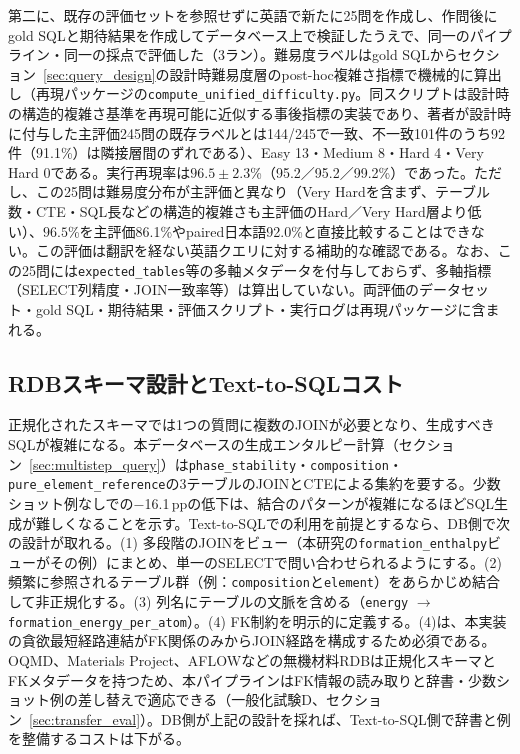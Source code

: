 \documentclass[twocolumn]{interact}
\begin{document}
第二に、既存の評価セットを参照せずに英語で新たに25問を作成し、作問後にgold SQLと期待結果を作成してデータベース上で検証したうえで、同一のパイプライン・同一の採点で評価した（3ラン）。難易度ラベルはgold SQLからセクション~\ref{sec:query_design}の設計時難易度層のpost-hoc複雑さ指標で機械的に算出し（再現パッケージの\texttt{compute\_unified\_difficulty.py}。同スクリプトは設計時の構造的複雑さ基準を再現可能に近似する事後指標の実装であり、著者が設計時に付与した主評価245問の既存ラベルとは144/245で一致、不一致101件のうち92件（91.1\%）は隣接層間のずれである）、Easy 13・Medium 8・Hard 4・Very Hard 0である。実行再現率は$96.5 \pm 2.3$\%（95.2／95.2／99.2\%）であった。ただし、この25問は難易度分布が主評価と異なり（Very Hardを含まず、テーブル数・CTE・SQL長などの構造的複雑さも主評価のHard／Very Hard層より低い）、$96.5$\%を主評価86.1\%やpaired日本語92.0\%と直接比較することはできない。この評価は翻訳を経ない英語クエリに対する補助的な確認である。なお、この25問には\texttt{expected\_tables}等の多軸メタデータを付与しておらず、多軸指標（SELECT列精度・JOIN一致率等）は算出していない。両評価のデータセット・gold SQL・期待結果・評価スクリプト・実行ログは再現パッケージに含まれる。

\subsection{RDBスキーマ設計とText-to-SQLコスト}
\label{sec:schema_design_cost}

正規化されたスキーマでは1つの質問に複数のJOINが必要となり、生成すべきSQLが複雑になる。本データベースの生成エンタルピー計算（セクション~\ref{sec:multistep_query}）は\texttt{phase\_stability}・\texttt{composition}・\texttt{pure\_element\_reference}の3テーブルのJOINとCTEによる集約を要する。少数ショット例なしでの$-$16.1\,ppの低下は、結合のパターンが複雑になるほどSQL生成が難しくなることを示す。Text-to-SQLでの利用を前提とするなら、DB側で次の設計が取れる。(1) 多段階のJOINをビュー（本研究の\texttt{formation\_enthalpy}ビューがその例）にまとめ、単一のSELECTで問い合わせられるようにする。(2) 頻繁に参照されるテーブル群（例：\texttt{composition}と\texttt{element}）をあらかじめ結合して非正規化する。(3) 列名にテーブルの文脈を含める（\texttt{energy} $\to$ \texttt{formation\_energy\_per\_atom}）。(4) FK制約を明示的に定義する。(4)は、本実装の貪欲最短経路連結がFK関係のみからJOIN経路を構成するため必須である。OQMD、Materials Project、AFLOWなどの無機材料RDBは正規化スキーマとFKメタデータを持つため、本パイプラインはFK情報の読み取りと辞書・少数ショット例の差し替えで適応できる（一般化試験D、セクション~\ref{sec:transfer_eval}）。DB側が上記の設計を採れば、Text-to-SQL側で辞書と例を整備するコストは下がる。
\end{document}
